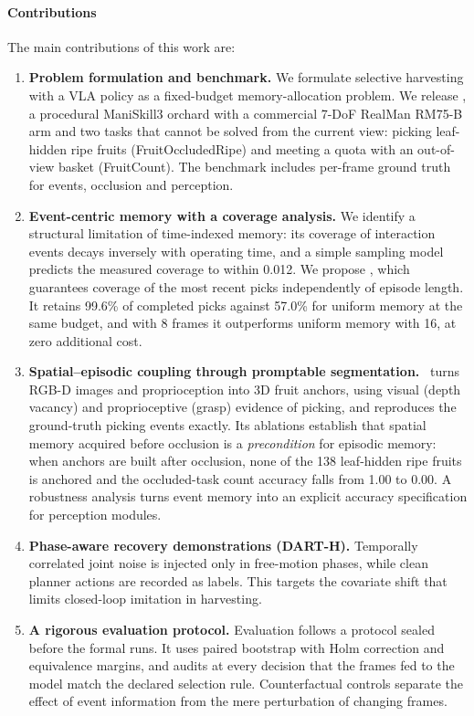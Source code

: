 \paragraph{Contributions} The main contributions of this work are:
\begin{enumerate}
\item \textbf{Problem formulation and benchmark.} We formulate selective harvesting with a VLA policy as a fixed-budget memory-allocation problem. We release \bench, a procedural ManiSkill3 orchard with a commercial 7-DoF RealMan RM75-B arm and two tasks that cannot be solved from the current view: picking leaf-hidden ripe fruits (FruitOccludedRipe) and meeting a quota with an out-of-view basket (FruitCount). The benchmark includes per-frame ground truth for events, occlusion and perception.
\item \textbf{Event-centric memory with a coverage analysis.} We identify a structural limitation of time-indexed memory: its coverage of interaction events decays inversely with operating time, and a simple sampling model predicts the measured coverage to within 0.012. We propose \pekm, which guarantees coverage of the most recent picks independently of episode length. It retains 99.6\% of completed picks against 57.0\% for uniform memory at the same budget, and with 8 frames it outperforms uniform memory with 16, at zero additional cost.
\item \textbf{Spatial--episodic coupling through promptable segmentation.} \fdm\ turns RGB-D images and proprioception into 3D fruit anchors, using visual (depth vacancy) and proprioceptive (grasp) evidence of picking, and reproduces the ground-truth picking events exactly. Its ablations establish that spatial memory acquired before occlusion is a \emph{precondition} for episodic memory: when anchors are built after occlusion, none of the 138 leaf-hidden ripe fruits is anchored and the occluded-task count accuracy falls from 1.00 to 0.00. A robustness analysis turns event memory into an explicit accuracy specification for perception modules.
\item \textbf{Phase-aware recovery demonstrations (DART-H).} Temporally correlated joint noise is injected only in free-motion phases, while clean planner actions are recorded as labels. This targets the covariate shift that limits closed-loop imitation in harvesting.
\item \textbf{A rigorous evaluation protocol.} Evaluation follows a protocol sealed before the formal runs. It uses paired bootstrap with Holm correction and equivalence margins, and audits at every decision that the frames fed to the model match the declared selection rule. Counterfactual controls separate the effect of event information from the mere perturbation of changing frames.
\end{enumerate}

